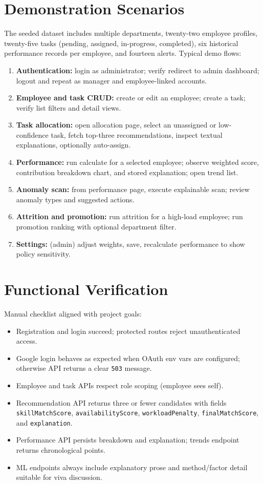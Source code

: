 \section{Demonstration Scenarios}
The seeded dataset includes multiple departments, twenty-two employee profiles, twenty-five tasks (pending, assigned, in-progress, completed), six historical performance records per employee, and fourteen alerts. Typical demo flows:

\begin{enumerate}
  \item \textbf{Authentication:} login as administrator; verify redirect to admin dashboard; logout and repeat as manager and employee-linked accounts.
  \item \textbf{Employee and task CRUD:} create or edit an employee; create a task; verify list filters and detail views.
  \item \textbf{Task allocation:} open allocation page, select an unassigned or low-confidence task, fetch top-three recommendations, inspect textual explanations, optionally auto-assign.
  \item \textbf{Performance:} run calculate for a selected employee; observe weighted score, contribution breakdown chart, and stored explanation; open trend list.
  \item \textbf{Anomaly scan:} from performance page, execute explainable scan; review anomaly types and suggested actions.
  \item \textbf{Attrition and promotion:} run attrition for a high-load employee; run promotion ranking with optional department filter.
  \item \textbf{Settings:} (admin) adjust weights, save, recalculate performance to show policy sensitivity.
\end{enumerate}

\section{Functional Verification}
Manual checklist aligned with project goals:
\begin{itemize}
  \item Registration and login succeed; protected routes reject unauthenticated access.
  \item Google login behaves as expected when OAuth env vars are configured; otherwise API returns a clear \texttt{503} message.
  \item Employee and task APIs respect role scoping (employee sees self).
  \item Recommendation API returns three or fewer candidates with fields \texttt{skillMatchScore}, \texttt{availabilityScore}, \texttt{workloadPenalty}, \texttt{finalMatchScore}, and \texttt{explanation}.
  \item Performance API persists breakdown and explanation; trends endpoint returns chronological points.
  \item ML endpoints always include explanatory prose and method/factor detail suitable for viva discussion.
\end{itemize}


